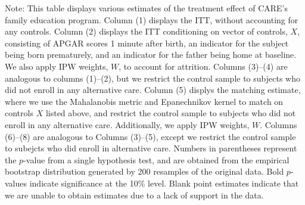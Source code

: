 \begin{table}[H]
\begin{threeparttable}
\begin{tabular}{cccccccccc}
  \hline\hline
  \end{tabular}
    \begin{tablenotes}
    \scriptsize
    \item 
Note: This table displays various estimates of the treatment effect of CARE's family education program.
Column (1) displays the ITT, without accounting for any controls.
Column (2) displays the ITT conditioning on vector of controls, $X$, consisting of APGAR scores 1 
minute after birth, an indicator for the subject being born prematurely, and an indicator for the 
father being home at baseline. We also apply IPW weights, $W$, to account for attrition.
Columns (3)--(4) are analogous to columns (1)--(2), but we restrict the control sample to subjects
who did not enroll in any alternative care.
Column (5) displys the matching estimate, where we use the Mahalanobis metric and Epanechnikov kernel
to match on controls $X$ listed above, and restrict the control sample to subjects who did not enroll
in any alternative care. Additionally, we apply IPW weights, $W$.
Columns (6)--(8) are analogous to Columns (3)--(5), except we restrict the control sample to subejcts
who did enroll in alternative care. 
Numbers in parentheses represent the $p$-value from a single hypothesis test, and are obtained from 
the empirical bootstrap distribution generated by 200 resamples of the original data. 
Bold $p$-values indicate significance at the 10\% level.
Blank point estimates indicate that we are unable to obtain estimates due to a lack of support in the data. 

    \end{tablenotes}
  \end{threeparttable}

\end{table}
